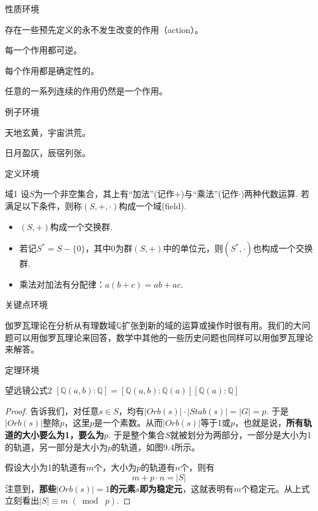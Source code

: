 性质环境
\begin{myprop}{}{}
	存在一些预先定义的永不发生改变的作用（action）。
\end{myprop}

\begin{myprop}{}{}
	每一个作用都可逆。
\end{myprop}

\begin{myprop}{}{}
	每个作用都是确定性的。
\end{myprop}

\begin{myprop}{}{}
	任意的一系列连续的作用仍然是一个作用。
\end{myprop}

例子环境
\begin{example}
	天地玄黄，宇宙洪荒。
	\soln
	
	日月盈仄，辰宿列张。
\end{example}

定义环境
\begin{mydef}{域}{1}
	设$S$为一个非空集合，其上有“加法”(记作$+$)与“乘法”(记作$\cdot$)两种代数运算. 若满足以下条件，则称$(S,+,\cdot)$构成一个域(field).
	\begin{itemize}
		\item[(1)] $(S,+)$构成一个交换群.
		\item[(2)] 若记$S^{*}=S-\{0\}$，其中$0$为群$(S,+)$中的单位元，则$(S^{*},\cdot)$也构成一个交换群.
		\item[(3)] 乘法对加法有分配律：$a ( b + c ) = a b + a c$.
	\end{itemize}
\end{mydef}

关键点环境
\begin{keypoint}
	伽罗瓦理论在分析从有理数域$\mathbb{ Q }$扩张到新的域的运算或操作时很有用。我们的大问题可以用伽罗瓦理论来回答，数学中其他的一些历史问题也同样可以用伽罗瓦理论来解答。
\end{keypoint}

定理环境
\begin{mythm}{望远镜公式}{2}
	$\left[\mathbb{Q}(a, b) : \mathbb{Q}\right]=\left[\mathbb{Q}(a, b) : \mathbb{Q}(a)\right]\left[\mathbb{Q}(a) : \mathbb{Q}\right] $
\end{mythm}

\begin{proof}
	
	告诉我们，对任意$s\in S$，均有$\lvert Orb(s)\rvert \cdot \lvert Stab(s)\rvert=\lvert G\rvert=p$. 于是$\lvert Orb(s)\rvert $整除$p$，这里$p$是一个素数。从而$\lvert Orb(s)\rvert $等于1或$p$，也就是说，\textbf{所有轨道的大小要么为1，要么为$p$}. 于是整个集合$S$就被划分为两部分，一部分是大小为1的轨道，另一部分是大小为$p$的轨道，如图9.4所示。
	
	假设大小为1的轨道有$m$个，大小为$p$的轨道有$n$个，则有
 \begin{equation}
		m+p\cdot n=\lvert S\rvert 
 \end{equation}
	注意到，\textbf{那些$\lvert Orb(s)\rvert =1$的元素$s$即为稳定元}，这就表明有$m$个稳定元。从上式立刻看出$\lvert S \rvert \equiv  m\; (\bmod\; p)$.	
\end{proof}

